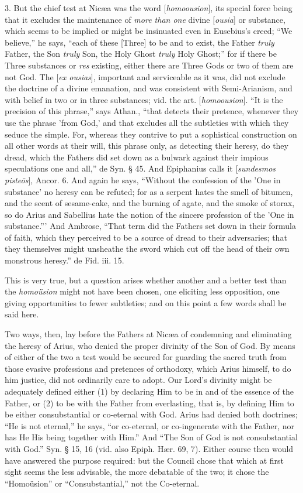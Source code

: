 3.
But the chief test at Nicæa was the word [\emph{homoousion}], its
special force being that it excludes the maintenance of \emph{more than
one} divine [\emph{ousia}] or substance, which seems to be implied
or might be insinuated even in Eusebius's creed; ``We believe,'' he
says, ``each of these [Three] to be and to exist, the Father \emph{truly}
Father, the Son \emph{truly} Son, the Holy Ghost \emph{truly} Holy
Ghost;'' for if there be Three substances or \emph{res} existing,
either there are Three Gods or two of them are not God. The [\emph{ex
ousias}], important and serviceable as it was, did not exclude the
doctrine of a divine emanation, and was consistent with Semi-Arianism,
and with belief in two or in three substances; vid. the art. [\emph{homoousion}]. ``It is the precision of this phrase,'' says Athan.,
``that detects their pretence, whenever they use the phrase 'from God,'
and that excludes all the subtleties with which they seduce the
simple. For, whereas they contrive to put a sophistical construction
on all other words at their will, this phrase only, as detecting their
heresy, do they dread, which the Fathers did set down as a bulwark
against their impious speculations one and all,'' de Syn. § 45. And
Epiphanius calls it [\emph{sundesmos piste\={o}s}], Ancor. 6. And
again he says, ``Without the confession of the 'One in substance' no
heresy can be refuted; for as a serpent hates the smell of bitumen,
and the scent of sesame-cake, and the burning of agate, and the smoke
of storax, so do Arius and Sabellius hate the notion of the sincere
profession of the 'One in substance.''' And Ambrose, ``That term did the
Fathers set down in their formula of faith, which they perceived to be
a source of dread to their adversaries; that they themselves might
unsheathe the sword which cut off the head of their own monstrous
heresy.'' de Fid. iii. 15.

This
is very true, but a question arises whether another and a better test
than the \emph{homoüsion} might not have been chosen, one eliciting
less opposition, one giving opportunities to fewer subtleties; and on
this point a few words shall be said here.

Two
ways, then, lay before the Fathers at Nicæa of condemning and
eliminating the heresy of Arius, who denied the proper divinity of the
Son of God. By means of either of the two a test would be secured for
guarding the sacred truth from those evasive professions and
pretences of orthodoxy, which Arius himself, to do him justice, did
not ordinarily care to adopt. Our Lord's divinity might be adequately
defined either (1) by declaring Him to be in and of the essence of the
Father, or (2) to be with the Father from everlasting, that is, by
defining Him to be either consubstantial or co-eternal with God. Arius
had denied both doctrines; ``He is not eternal,'' he says, ``or
co-eternal, or co-ingenerate with the Father, nor has He His being
together with Him.'' And ``The Son of God is not consubstantial with
God.'' Syn. § 15, 16 (vid. also Epiph. Hær. 69, 7). Either course
then would have answered the purpose required: but the Council chose
that which at first sight seems the less advisable, the more debatable
of the two; it chose the ``Homoüsion'' or ``Consubstantial,'' not the
Co-eternal.

